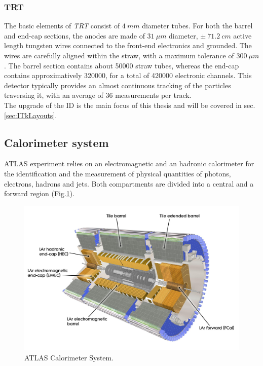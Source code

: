\documentclass[a4paper,twoside,12pt]{article}
\begin{document}
\subsubsection*{TRT}
The basic elements of \textit{TRT} consist of $4\ mm$ diameter tubes\cite{Aad:2008zzm}. For both the barrel
and end-cap sections, the anodes are made of $31\ \mu m$ diameter, $\pm\ 71.2\ cm$ 
active length tungsten wires 
connected to the front-end electronics and grounded. The wires are carefully aligned within
the straw, with a maximum tolerance of $300\ \mu m$. The barrel section contains about 
50000 straw tubes, whereas the end-cap contains approximatively 320000,
for a total of 420000 electronic channels\cite{ATLAS:1997ag}. This detector typically provides
an almost continuous tracking of the particles traversing it, with an average of 36 measurements per track.\\

\bigskip
The upgrade of the ID is the main focus of this thesis and will be covered in sec.\ref{sec:ITkLayouts}.


\subsection{Calorimeter system}

ATLAS experiment  relies on an electromagnetic and an hadronic calorimeter for the identification and the measurement of physical quantities of photons, electrons, hadrons and jets. 
Both compartments are divided into a central and a forward region (Fig.\ref{fig:current_Cals}).

\begin{figure} [h]
	\includegraphics[width=\textwidth]{current_Cals}
	\caption{ATLAS Calorimeter System.}
	\label{fig:current_Cals}
\end{figure}
\end{document}
